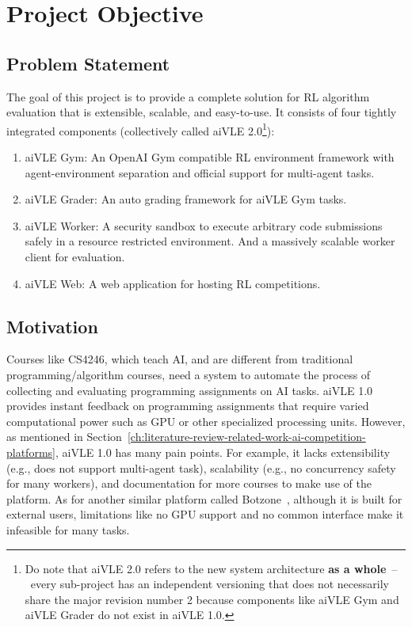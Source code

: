 \chapter{Project Objective}
\label{ch:project-objective}
\section{Problem Statement}
\label{s:project-objective-problem-statement}
The goal of this project is to provide a complete solution for RL algorithm evaluation that is extensible, scalable, and easy-to-use. It consists of four tightly integrated components (collectively called aiVLE 2.0\footnote{Do note that aiVLE 2.0 refers to the new system architecture \textbf{as a whole}~–~every sub-project has an independent versioning that does not necessarily share the major revision number 2 because components like aiVLE Gym and aiVLE Grader do not exist in aiVLE 1.0.}):

\begin{enumerate}
    \item aiVLE Gym: An OpenAI Gym \parencite{openai-gym} compatible RL environment framework with agent-environment separation and official support for multi-agent tasks.
    \item aiVLE Grader: An auto grading framework for aiVLE Gym tasks.
    \item aiVLE Worker: A security sandbox to execute arbitrary code submissions safely in a resource restricted environment. And a massively scalable worker client for evaluation.
    \item aiVLE Web: A web application for hosting RL competitions.
\end{enumerate}

\section{Motivation}
\label{s:project-objective-motivation}
Courses like CS4246, which teach AI, and are different from traditional programming/algorithm courses, need a system to automate the process of collecting and evaluating programming assignments on AI tasks. aiVLE 1.0 provides instant feedback on programming assignments that require varied computational power such as GPU or other specialized processing units. However, as mentioned in Section~\ref{ch:literature-review-related-work-ai-competition-platforms}, aiVLE 1.0 has many pain points. For example, it lacks extensibility (e.g., does not support multi-agent task), scalability (e.g., no concurrency safety for many workers), and documentation for more courses to make use of the platform. As for another similar platform called Botzone~\parencite{botzone}, although it is built for external users, limitations like no GPU support and no common interface make it infeasible for many tasks.

